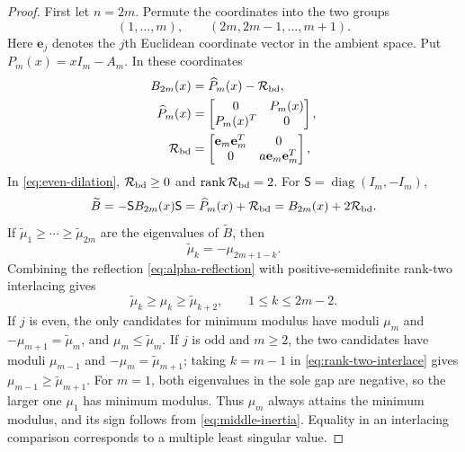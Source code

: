 \documentclass[11pt,a4paper]{article}
\numberwithin{equation}{section}
\DeclareMathOperator{\diag}{diag}
\begin{document}
\begin{proof}
First let \(n=2m\).  Permute the coordinates into the two groups
\[
 (1,\ldots,m),\qquad(2m,2m-1,\ldots,m+1).
\]
Here \(\mathbf e_j\) denotes the \(j\)th Euclidean coordinate vector in
the ambient space.  Put \(P_m(x)=xI_m-A_m\).  In these coordinates
\begin{equation}\label{eq:even-dilation}
\begin{aligned}
 B_{2m}(x)&=\widehat P_m(x)-\mathcal R_{\rm bd},\\
 \widehat P_m(x)&=\begin{bmatrix}0&P_m(x)\\P_m(x)^T&0\end{bmatrix},\\
 \mathcal R_{\rm bd}
 &=\begin{bmatrix}\mathbf e_m\mathbf e_m^T&0\\
 0&a \mathbf e_m\mathbf e_m^T\end{bmatrix},
\end{aligned}
\end{equation}
In \eqref{eq:even-dilation},
\(\mathcal R_{\rm bd}\geq0\) and
\(\operatorname{rank}\mathcal R_{\rm bd}=2\).  For
\(\mathsf S=\diag(I_m,-I_m)\),
\[
 \widetilde B=-\mathsf S B_{2m}(x)\mathsf S
 =\widehat P_m(x)+\mathcal R_{\rm bd}
 =B_{2m}(x)+2\mathcal R_{\rm bd}.
\]
If \(\widetilde\mu_1\geq\cdots\geq\widetilde\mu_{2m}\) are the
eigenvalues of
\(\widetilde B\), then
\begin{equation}\label{eq:alpha-reflection}
 \widetilde\mu_k=-\mu_{2m+1-k}.
\end{equation}
Combining the reflection \eqref{eq:alpha-reflection} with
positive-semidefinite rank-two interlacing gives
\begin{equation}\label{eq:rank-two-interlace}
 \widetilde\mu_k\geq\mu_k\geq\widetilde\mu_{k+2},
 \qquad1\leq k\leq2m-2.
\end{equation}
If \(j\) is even, the only candidates for minimum modulus
have moduli \(\mu_m\) and
\(-\mu_{m+1}=\widetilde\mu_m\), and
\(\mu_m\leq\widetilde\mu_m\).  If \(j\) is odd and \(m\geq2\), the two
candidates have moduli \(\mu_{m-1}\) and
\(-\mu_m=\widetilde\mu_{m+1}\); taking \(k=m-1\) in
\eqref{eq:rank-two-interlace} gives
\(\mu_{m-1}\geq\widetilde\mu_{m+1}\).  For \(m=1\), both eigenvalues in
the sole gap are negative, so the larger one \(\mu_1\) has minimum
modulus.  Thus \(\mu_m\) always attains the minimum modulus, and its
sign follows from \eqref{eq:middle-inertia}.  Equality in an interlacing
comparison corresponds to a multiple least singular value.


\end{proof}
\end{document}
